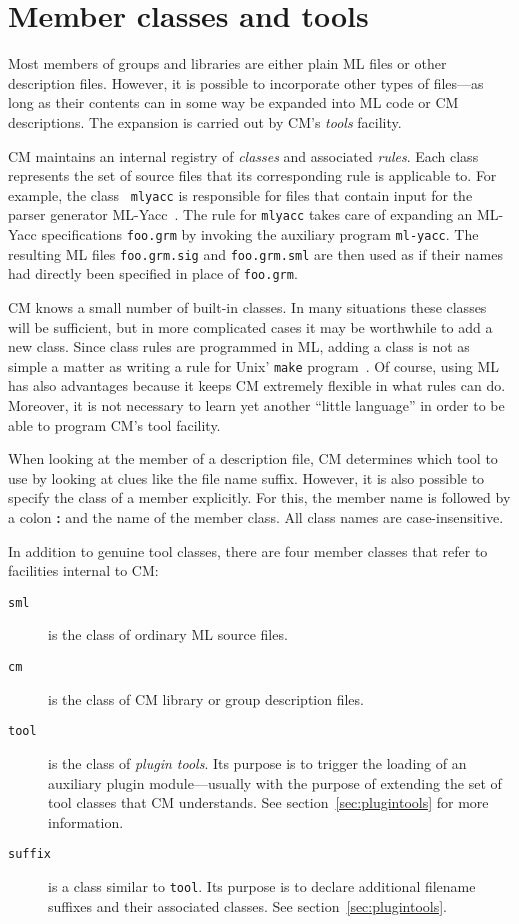 %

\section{Member classes and tools}
\label{sec:classes}

Most members of groups and libraries are either plain ML files or
other description files.  However, it is possible to incorporate other
types of files---as long as their contents can in some way be expanded
into ML code or CM descriptions.  The expansion is carried out by CM's
{\it tools} facility.

CM maintains an internal registry of {\em classes} and associated {\em
rules}.  Each class represents the set of source files that its
corresponding rule is applicable to.  For example, the class {\tt
mlyacc} is responsible for files that contain input for the parser
generator ML-Yacc~\cite{tarditi90:yacc}.  The rule for {\tt mlyacc}
takes care of expanding an ML-Yacc specifications {\tt foo.grm} by
invoking the auxiliary program {\tt ml-yacc}.  The resulting ML files
{\tt foo.grm.sig} and {\tt foo.grm.sml} are then used as if their
names had directly been specified in place of {\tt foo.grm}.

CM knows a small number of built-in classes.  In many situations these
classes will be sufficient, but in more complicated cases it may be
worthwhile to add a new class.  Since class rules are programmed in
ML, adding a class is not as simple a matter as writing a rule for
{\sc Unix}' {\tt make} program~\cite{feldman79}.  Of course,
using ML has also advantages because it keeps CM extremely flexible in
what rules can do.  Moreover, it is not necessary to learn yet another
``little language'' in order to be able to program CM's tool facility.

When looking at the member of a description file, CM determines which
tool to use by looking at clues like the file name suffix.  However,
it is also possible to specify the class of a member explicitly.  For
this, the member name is followed by a colon {\bf :} and the name of
the member class.  All class names are case-insensitive.

In addition to genuine tool classes, there are four member classes
that refer to facilities internal to CM:
\begin{description}
\item[{\tt sml}] is the class of ordinary ML source files.
\item[{\tt cm}] is the class of CM library or group description files.
\item[{\tt tool}] is the class of {\em plugin tools}.  Its purpose is
to trigger the loading of an auxiliary plugin module---usually with the
purpose of extending the set of tool classes that CM understands.
See section~\ref{sec:plugintools} for more information.
\item[{\tt suffix}] is a class similar to {\tt tool}.  Its purpose is
to declare additional filename suffixes and their associated classes.
See section~\ref{sec:plugintools}.
\end{description}


